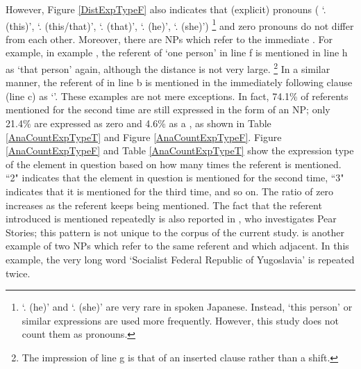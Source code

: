 However,
Figure \ref{DistExpTypeF} also indicates that
(explicit) pronouns ( `. (this)',  `. (this/that)',  `. (that)',  `. (he)',  `. (she)')%
	\footnote{
	 `. (he)' and  `. (she)' are very rare in spoken Japanese.
	Instead,  `this person' or similar expressions are used more frequently.
	However, this study does not count them as pronouns.
	}
and zero pronouns do not differ from each other.
Moreover, there are NPs which refer to the immediate .
For example, in example \Last,
the referent of  `one person' in line f is mentioned in line h as  `that person' again,
although the distance is not very large.%
	\footnote{
	The impression of line g is that of an inserted clause rather than a  shift.
	}
In a similar manner,
the referent of  in line b is mentioned in the immediately following clause (line c) as  `'.
These examples are not mere exceptions.
In fact, 74.1\% of referents mentioned for the second time are still expressed in the form of an NP;
only 21.4\% are expressed as zero and 4.6\% as a ,
as shown in Table \ref{AnaCountExpTypeT} and Figure \ref{AnaCountExpTypeF}.
Figure \ref{AnaCountExpTypeF} and Table \ref{AnaCountExpTypeT} show
the expression type of the element in question based on how many times the referent is mentioned.
``2" indicates that the element in question is mentioned for the second time,
``3" indicates that it is mentioned for the third time, and so on.
The ratio of zero increases as the referent keeps being mentioned.
The fact that the referent introduced is mentioned repeatedly is also reported in , who investigates Pear Stories;
this pattern is not unique to the corpus of the current study.
\Next is another example
of two NPs which refer to the same referent and which adjacent.
In this example,
the very long word  `Socialist Federal Republic of Yugoslavia' is repeated twice.
